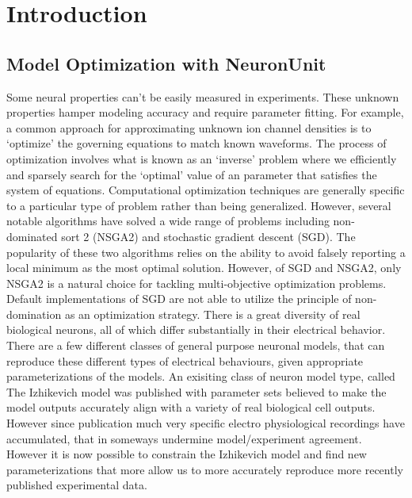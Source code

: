 \section{Introduction}
\subsection{Model  Optimization with NeuronUnit}
Some neural properties can’t be easily measured in experiments. These unknown properties hamper modeling accuracy and require parameter fitting. For example, a common approach for approximating unknown ion channel densities is to ‘optimize’ the governing equations to match known waveforms. The process of optimization involves what is known as an ‘inverse’ problem where we efficiently and sparsely search for the ‘optimal’ value of an parameter that satisfies the system of equations. Computational optimization techniques are generally specific to a particular type of problem rather than being generalized. However, several notable algorithms have solved a wide range of problems including non-dominated sort 2 (NSGA2) and stochastic gradient descent (SGD). The popularity of these two algorithms relies on the ability to avoid falsely reporting a local minimum as the most optimal solution. However, of SGD and NSGA2, only NSGA2 is a natural choice for tackling multi-objective optimization problems. Default implementations of SGD are not able to utilize the principle of non-domination as an optimization strategy.\newline
\newline
There is a great diversity of real biological neurons, all of which differ substantially in their electrical behavior. There are a few different classes of general purpose neuronal models, that can reproduce these different types of electrical behaviours, given appropriate parameterizations of the models.\newline
\newline
An exisiting class of neuron model type, called The Izhikevich model was published with parameter sets believed to make the model outputs accurately align with a variety of real biological cell outputs. However since publication much very specific electro physiological recordings have accumulated, that in someways undermine model/experiment agreement. However it is now possible to constrain the Izhikevich model and find new parameterizations that more allow us to more accurately reproduce more recently published experimental data.\newline
